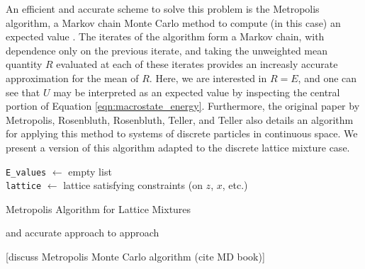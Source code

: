 \documentclass[10pt]{article}
\begin{document}
An efficient and accurate scheme to solve this problem is the Metropolis algorithm, a Markov chain Monte Carlo method to compute (in this case) an expected value \cite{metropolis_hastings}.
The iterates of the algorithm form a Markov chain, with dependence only on the previous iterate, and taking the unweighted mean quantity $R$ evaluated at each of these iterates provides an increasly accurate approximation for the mean of $R$.
Here, we are interested in $R=E$, and one can see that $U$ may be interpreted as an expected value by inspecting the central portion of Equation \ref{eqn:macrostate_energy}.
Furthermore, the original paper by Metropolis, Rosenbluth, Rosenbluth, Teller, and Teller also details an algorithm for applying this method to systems of discrete particles in continuous space.
We present a version of this algorithm adapted to the discrete lattice mixture case.

\begin{algorithm}[H]
    \SetAlgoLined
    \texttt{E\_values} $\gets$ empty list \\
    \texttt{lattice} $\gets$ lattice satisfying constraints (on $z$, $x$, etc.) \\
    \caption{Metropolis Algorithm for Lattice Mixtures}
\end{algorithm}


and accurate approach to approach 

[discuss Metropolis Monte Carlo algorithm (cite MD book)]
\end{document}

